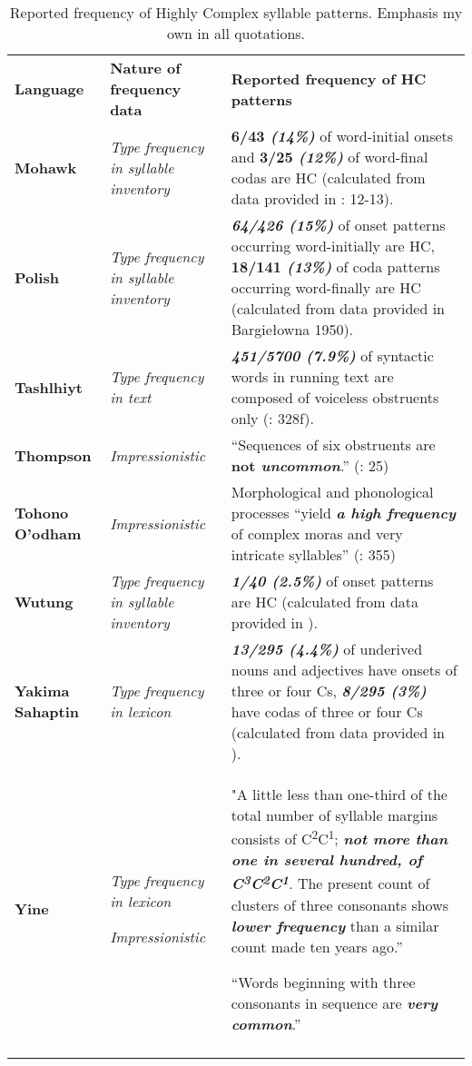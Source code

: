 \begin{table}
\begin{tabularx}{\textwidth}{XXX}
\lsptoprule

\textbf{Language} & \textbf{Nature of frequency data} & \textbf{Reported frequency of HC patterns}\\
\textbf{Mohawk} & \textit{Type frequency in syllable inventory} & \textbf{6/43 \textit{(14\%)}} of word-initial onsets and \textbf{3/25 \textit{(12\%)}} of word-final codas are HC (calculated from data provided in \citealt{Michelson1988}: 12-13).\\
\textbf{Polish} & \textit{Type frequency in syllable inventory} & \textbf{\textit{64/426 (15\%)}} of onset patterns occurring word-initially are HC,\textbf{ \textbf{18/141} \textit{(13\%)}} of coda patterns occurring word-finally are HC (calculated from data provided in Bargiełowna 1950).\\
{\bfseries Tashlhiyt} & \textit{Type frequency in text} & \textbf{\textit{451/5700 (7.9\%)}} of syntactic words in running text are composed of voiceless obstruents only (\citealt{Ridouane2008}: 328f).\\
\textbf{Thompson} & \textit{Impressionistic} & “Sequences of six obstruents are\textbf{ \textbf{not} \textit{uncommon}}.” (\citealt{ThompsonThompson1992}: 25)\\
\textbf{Tohono O’odham} & \textit{Impressionistic} & Morphological and phonological processes “yield \textbf{\textit{a high frequency}} of complex moras and very intricate syllables” (\citealt{HillZepeda1992}: 355)\\
\textbf{Wutung} & \textit{Type frequency in syllable inventory} & \textbf{\textit{1/40 (2.5\%)} }of\textbf{ }onset patterns are HC (calculated from data provided in \citealt{Marmion2010}).\\
\textbf{Yakima Sahaptin} & \textit{Type frequency in lexicon} & \textbf{\textit{13/295 (4.4\%)}} of underived nouns and adjectives have onsets of three or four Cs, \textbf{\textit{8/295 (3\%)}} have codas of three or four Cs (calculated from data provided in \citealt{HargusBeavert2006}).\\
\textbf{Yine} & \textit{Type frequency in lexicon}

\textit{Impressionistic} & "A little less than one-third of the total number of syllable margins consists of C\textsuperscript{2}C\textsuperscript{1}; \textbf{\textit{not more than one in several hundred, of C}}\textbf{\textit{\textsuperscript{3}}}\textbf{\textit{C}}\textbf{\textit{\textsuperscript{2}}}\textbf{\textit{C}}\textbf{\textit{\textsuperscript{1}}}. The present count of clusters of three consonants shows \textbf{\textit{lower frequency}} than a similar count made ten years ago.” \citep[24]{Matteson1965}

“Words beginning with three consonants in sequence are \textbf{\textit{very common}}.” \citep[26]{Hanson2010}\\
\lspbottomrule
\end{tabularx}
\caption{\label{tab:3.14cont} Reported frequency of Highly Complex syllable patterns. Emphasis my own in all quotations.}
\end{table}

